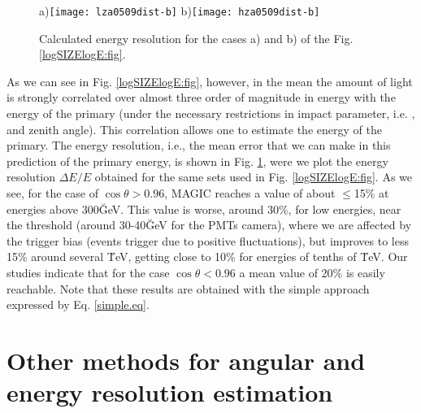 \begin{figure}[t]
\centering
a)\texttt{[image: lza0509dist-b]}
\hfil
b)\texttt{[image: hza0509dist-b]}
\caption{\label{resolutions:fig}
  Calculated energy resolution for the cases a) and b) of the Fig.
  \protect\ref{logSIZElogE:fig}.}
\vskip -15pt
\end{figure}

As we can see in Fig.  \ref{logSIZElogE:fig}, however, in the mean the
amount  of light  is  strongly correlated over  almost  three order of
magnitude  in  energy with   the   energy of the  primary  (under  the
necessary restrictions in impact parameter, i.e. \DISTANCE, and zenith
angle).    This correlation allows one  to  estimate the energy of the
primary.  The energy resolution, i.e., the mean error that we can make
in  this   prediction of the   primary    energy, is  shown  in  Fig.  
\ref{resolutions:fig}, were we plot the energy resolution $\Delta E/E$
obtained for the same sets  used in Fig.  \ref{logSIZElogE:fig}. As we
see, for the case of $\cos\theta>0.96$, MAGIC reaches a value of about
$\leq$15\%  at energies above  300\u{GeV}. This value is worse, around
30\%, for low energies,  near the  threshold (around 30-40\u{GeV}  for
the PMTs camera),  where we are affected by  the  trigger bias (events
trigger due to   positive  fluctuations), but  improves to  less  15\%
around several  \u{TeV}, getting close to  10\% for energies of tenths
of \u{TeV}.  Our studies indicate that  for the case $\cos\theta<0.96$
a mean value of 20\% is easily reachable.  Note that these results are
obtained with the simple approach expressed by Eq.  \ref{simple.eq}.

\section{Other methods for angular and energy resolution estimation}

\endinput
%

